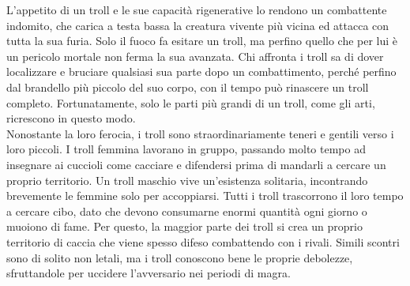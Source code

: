 \begin{multicols}{2}
L’appetito di un troll e le sue capacità rigenerative lo rendono un combattente indomito, che carica a testa bassa la creatura vivente più vicina ed attacca con tutta la sua furia. Solo il fuoco fa esitare un troll, ma perfino quello che per lui è un pericolo mortale non ferma la sua avanzata. Chi affronta i troll sa di dover localizzare e bruciare qualsiasi sua parte dopo un combattimento, perché perfino dal brandello più piccolo del suo corpo, con il tempo può rinascere un troll completo. Fortunatamente, solo le parti più grandi di un troll, come gli arti, ricrescono in questo modo.\\

Nonostante la loro ferocia, i troll sono straordinariamente teneri e gentili verso i loro piccoli. I troll femmina lavorano in gruppo, passando molto tempo ad insegnare ai cuccioli come cacciare e difendersi prima di mandarli a cercare un proprio territorio. Un troll maschio vive un’esistenza solitaria, incontrando brevemente le femmine solo per accoppiarsi. Tutti i troll trascorrono il loro tempo a cercare cibo, dato che devono consumarne enormi quantità ogni giorno o muoiono di fame. Per questo, la maggior parte dei troll si crea un proprio territorio di caccia che viene spesso difeso combattendo con i rivali. Simili scontri sono di solito non letali, ma i troll conoscono bene le proprie debolezze, sfruttandole per uccidere l’avversario nei periodi di magra.\\


\end{multicols}
